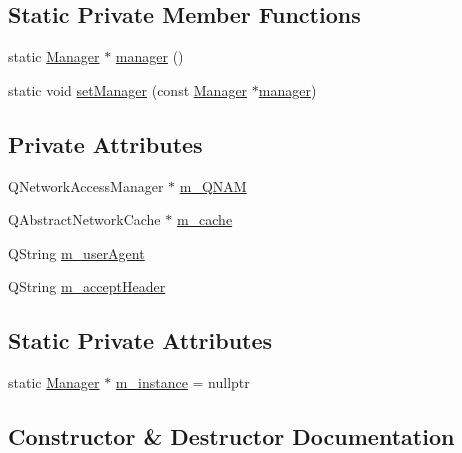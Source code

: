 \subsection*{Static Private Member Functions}
\begin{DoxyCompactItemize}
\item 
static \mbox{\hyperlink{classNetwork_1_1Manager}{Manager}} $\ast$ \mbox{\hyperlink{classNetwork_1_1Manager_a42c71474900c4d1e68740ae8d73db848}{manager}} ()
\item 
static void \mbox{\hyperlink{classNetwork_1_1Manager_a1bc97c8b2dc5a4be751005d6a5dcf0a0}{set\+Manager}} (const \mbox{\hyperlink{classNetwork_1_1Manager}{Manager}} $\ast$\mbox{\hyperlink{classNetwork_1_1Manager_a42c71474900c4d1e68740ae8d73db848}{manager}})
\end{DoxyCompactItemize}
\subsection*{Private Attributes}
\begin{DoxyCompactItemize}
\item 
Q\+Network\+Access\+Manager $\ast$ \mbox{\hyperlink{classNetwork_1_1Manager_a6f69f8099c8706abebd1a4497e5038f8}{m\+\_\+\+Q\+N\+AM}}
\item 
Q\+Abstract\+Network\+Cache $\ast$ \mbox{\hyperlink{classNetwork_1_1Manager_aa99fb56d9b2a75b5f5a63a191002f461}{m\+\_\+cache}}
\item 
Q\+String \mbox{\hyperlink{classNetwork_1_1Manager_a59e8c58e1efd376525f400750ee87943}{m\+\_\+user\+Agent}}
\item 
Q\+String \mbox{\hyperlink{classNetwork_1_1Manager_a04138b3a1b6b6d9a0c8816de74ab50a2}{m\+\_\+accept\+Header}}
\end{DoxyCompactItemize}
\subsection*{Static Private Attributes}
\begin{DoxyCompactItemize}
\item 
static \mbox{\hyperlink{classNetwork_1_1Manager}{Manager}} $\ast$ \mbox{\hyperlink{classNetwork_1_1Manager_a02ab401c85b17ffca2b9f3f69a4bae3b}{m\+\_\+instance}} = nullptr
\end{DoxyCompactItemize}


\subsection{Constructor \& Destructor Documentation}
\mbox{\label{classNetwork_1_1Manager_a27a2bbafd7cc4cd15d04c4a00afaae95}} 
